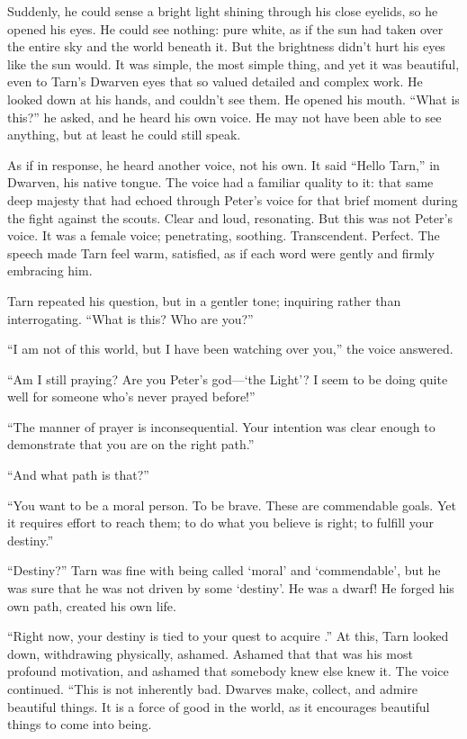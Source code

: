Suddenly, he could sense a bright light shining through his close eyelids, so he opened his eyes.  He could see nothing: pure white, as if the sun had taken over the entire sky and the world beneath it.  But the brightness didn't hurt his eyes like the sun would.  It was simple, the most simple thing, and yet it was beautiful, even to Tarn's Dwarven eyes that so valued detailed and complex work.  He looked down at his hands, and couldn't see them.  He opened his mouth.  ``What is this?'' he asked, and he heard his own voice.  He may not have been able to see anything, but at least he could still speak.

As if in response, he heard another voice, not his own.  It said ``Hello Tarn,''  in Dwarven, his native tongue.  The voice had a familiar quality to it: that same deep majesty that had echoed through Peter's voice for that brief moment during the fight against the scouts.  Clear and loud, resonating.  But this was not Peter's voice.  It was a female voice; penetrating, soothing.  Transcendent.  Perfect.  The speech made Tarn feel warm, satisfied, as if each word were gently and firmly embracing him.

Tarn repeated his question, but in a gentler tone; inquiring rather than interrogating.  ``What is this?  Who are you?''

``I am not of this world, but I have been watching over you,'' the voice answered.

``Am I still praying?  Are you Peter's god---`the Light'?  I seem to be doing quite well for someone who's never prayed before!''

``The manner of prayer is inconsequential.  Your intention was clear enough to demonstrate that you are on the right path.''

``And what path is that?''

``You want to be a moral person.  To be brave.  These are commendable goals.  Yet it requires effort to reach them; to do what you believe is right; to fulfill your destiny.''

``Destiny?'' Tarn was fine with being called `moral' and `commendable', but he was sure that he was not driven by some `destiny'.  He was a dwarf!  He forged his own path, created his own life.

``Right now, your destiny is tied to your quest to acquire \kildir.''  At this, Tarn looked down, withdrawing physically, ashamed.  Ashamed that that was his most profound motivation, and ashamed that somebody knew else knew it.  The voice continued. ``This is not inherently bad.  Dwarves make, collect, and admire beautiful things.  It is a force of good in the world, as it encourages beautiful things to come into being.

